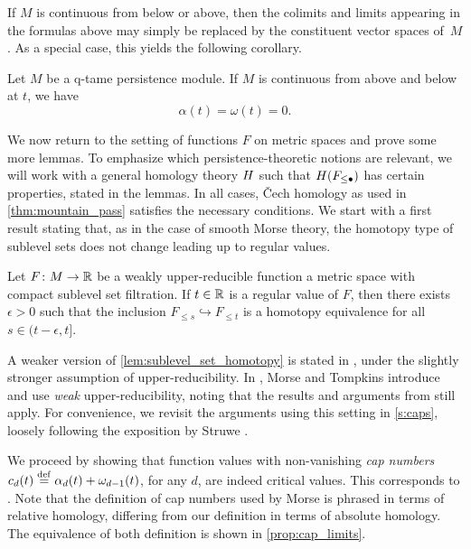 If $M$ is continuous from below or above, then the colimits and limits appearing in the formulas above may simply be replaced by the constituent vector spaces of~$M$.
As a special case, this yields the following corollary.

\begin{cor}
\label{cor:regular_value_no_endpoint}
	Let $M$ be a q-tame persistence module.
	If $M$ is continuous from above and below at $t$, we have
	\[
		\alpha(t) = \omega(t) = 0.
	\]
\end{cor}

We now return to the setting of functions $F$ on metric spaces and prove some more lemmas.
To emphasize which persistence-theoretic notions are relevant, we will work with a general homology theory $H$ such that $H(F_{\leq \bullet})$ has certain properties, stated in the lemmas.
In all cases, \v{C}ech homology as used in \cref{thm:mountain_pass} satisfies the necessary conditions.
We start with a first result stating that, as in the case of smooth Morse theory, the homotopy type of sublevel sets does not change leading up to regular values.

\begin{lem}\label{lem:sublevel_set_homotopy}
	Let $F \colon M \to \mathbb{R}$ be a weakly upper-reducible function a metric space with compact sublevel set filtration.
	If $t \in \mathbb{R}$ is a regular value of $F$, then there exists $\epsilon > 0$ such that the inclusion $F_{\leq s} \hookrightarrow F_{\leq t}$ is a homotopy equivalence for all $s \in (t - \epsilon, t]$.
\end{lem}

A weaker version of \cref{lem:sublevel_set_homotopy} is stated in \cite[Lemma 8.1]{Morse.1938}, under the slightly stronger assumption of upper-reducibility.
In \cite{Morse.1939}, Morse and Tompkins introduce and use \emph{weak} upper-reducibility, noting that the results and arguments from \cite[Sections 7 and 8]{Morse.1938} still apply.
For convenience, we revisit the arguments using this setting in \cref{s:caps}, loosely following the exposition by Struwe \cite[Remark II.6.3]{Struwe.1988}.

We proceed by showing that function values with non-vanishing \emph{cap numbers} $c_d(t) \stackrel{\mathrm{def}}{=} \alpha_d(t) + \omega_{d-1}(t)$, for any $d$, are indeed critical values.
This corresponds to \cite[Theorem 8.1]{Morse.1938}.
Note that the definition of cap numbers used by Morse is phrased in terms of relative homology, differing from our definition in terms of absolute homology. The equivalence of both definition is shown in \cref{prop:cap_limits}.

